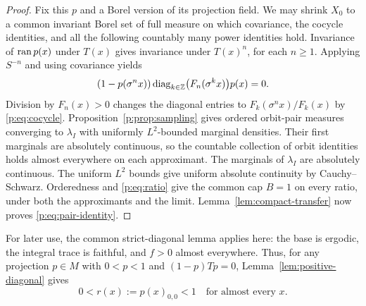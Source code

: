 \begin{proof}
Fix this $p$ and a Borel version of its projection field. We may
shrink $X_0$ to a common invariant Borel set of full measure on
which covariance, the cocycle identities, and all the following
countably many power identities hold. Invariance of $\operatorname{ran} p(x)$
under $T(x)$ gives invariance under $T(x)^n$, for each $n\geq1$.
Applying $S^{-n}$ and using covariance yields
\begin{equation}\label{p:eq:orbit-inclusion}
 (1-p(\sigma^n x))
 \operatorname{diag}_{k\in\mathbb Z}\bigl(F_n(\sigma^k x)\bigr)p(x)=0.
\end{equation}
Division by $F_n(x)>0$ changes the diagonal entries to
$F_k(\sigma^n x)/F_k(x)$ by \eqref{p:eq:cocycle}.
Proposition~\ref{p:prop:sampling} gives ordered orbit-pair measures
converging to $\lambda_I$ with uniformly $L^2$-bounded marginal
densities. Their first marginals are absolutely continuous, so the
countable collection of orbit identities holds almost everywhere
on each approximant. The marginals of $\lambda_I$ are absolutely
continuous. The uniform $L^2$ bounds give uniform absolute continuity
by Cauchy--Schwarz. Orderedness and \eqref{p:eq:ratio} give the common
cap $B=1$ on every ratio, under both the approximants and the limit.
Lemma~\ref{lem:compact-transfer} now proves
\eqref{p:eq:pair-identity}.
\end{proof}

For later use, the common strict-diagonal lemma applies here: the base
is ergodic, the integral trace is faithful, and $f>0$ almost everywhere.
Thus, for any projection $p\in M$ with $0<p<1$ and $(1-p)Tp=0$,
Lemma~\ref{lem:positive-diagonal} gives
\begin{equation}\label{p:eq:strict-diagonal}
 0<r(x):=p(x)_{0,0}<1\quad\text{for almost every }x.
\end{equation}
